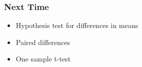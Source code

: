 \documentclass[slides]{beamer}
\begin{document}
\begin{frame}[fragile]
\frametitle{Next Time}

\begin{itemize}
\item Hypothesis test for differences in means
\item Paired differences
\item One sample t-test
\end{itemize}


\end{frame}
\end{document}
